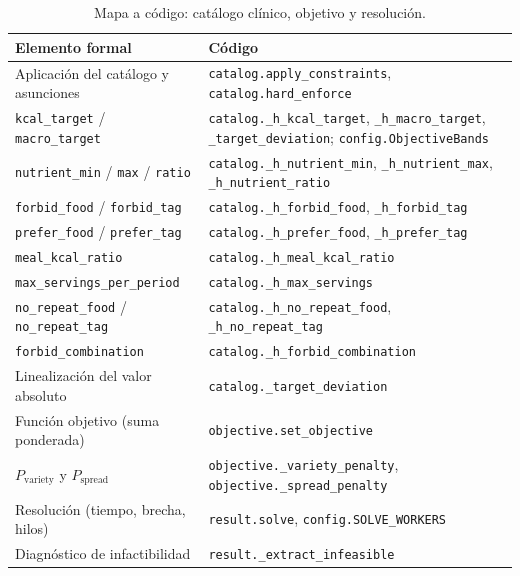 \begin{table}[htbp]
\centering
\small
\begin{tabular}{|l|p{7.3cm}|}
\hline
\textbf{Elemento formal} & \textbf{Código} \\
\hline
Aplicación del catálogo y asunciones & \texttt{catalog.apply\_constraints}, \texttt{catalog.hard\_enforce} \\
\hline
\texttt{kcal\_target} / \texttt{macro\_target} & \texttt{catalog.\_h\_kcal\_target}, \texttt{\_h\_macro\_target}, \texttt{\_target\_deviation}; \texttt{config.ObjectiveBands} \\
\hline
\texttt{nutrient\_min} / \texttt{max} / \texttt{ratio} & \texttt{catalog.\_h\_nutrient\_min}, \texttt{\_h\_nutrient\_max}, \texttt{\_h\_nutrient\_ratio} \\
\hline
\texttt{forbid\_food} / \texttt{forbid\_tag} & \texttt{catalog.\_h\_forbid\_food}, \texttt{\_h\_forbid\_tag} \\
\hline
\texttt{prefer\_food} / \texttt{prefer\_tag} & \texttt{catalog.\_h\_prefer\_food}, \texttt{\_h\_prefer\_tag} \\
\hline
\texttt{meal\_kcal\_ratio} & \texttt{catalog.\_h\_meal\_kcal\_ratio} \\
\hline
\texttt{max\_servings\_per\_period} & \texttt{catalog.\_h\_max\_servings} \\
\hline
\texttt{no\_repeat\_food} / \texttt{no\_repeat\_tag} & \texttt{catalog.\_h\_no\_repeat\_food}, \texttt{\_h\_no\_repeat\_tag} \\
\hline
\texttt{forbid\_combination} & \texttt{catalog.\_h\_forbid\_combination} \\
\hline
Linealización del valor absoluto & \texttt{catalog.\_target\_deviation} \\
\hline
Función objetivo (suma ponderada) & \texttt{objective.set\_objective} \\
\hline
$P_{\text{variety}}$ y $P_{\text{spread}}$ & \texttt{objective.\_variety\_penalty}, \texttt{objective.\_spread\_penalty} \\
\hline
Resolución (tiempo, brecha, hilos) & \texttt{result.solve}, \texttt{config.SOLVE\_WORKERS} \\
\hline
Diagnóstico de infactibilidad & \texttt{result.\_extract\_infeasible} \\
\hline
\end{tabular}
\caption{Mapa a código: catálogo clínico, objetivo y resolución.}
\label{tab:anexoMapaCatalogo}
\end{table}
